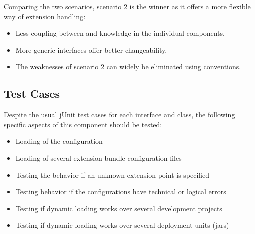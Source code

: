 Comparing the two scenarios, scenario 2 is the winner as it offers a more flexible way of extension handling:
\begin{itemize}
	\item Less coupling between and knowledge in the individual components.
	\item More generic interfaces offer better changeability.
	\item The weaknesses of scenario 2 can widely be eliminated using conventions.
\end{itemize}


\subsection{Test Cases}
\label{sec:TestCasesCOMPextensionManagement}

Despite the usual jUnit test cases for each interface and class, the following specific aspects of this component should be tested:
\begin{itemize}
	\item Loading of the \COMPextensionManagement{} configuration
	\item Loading of several extension bundle configuration files
	\item Testing the behavior if an unknown extension point is specified
	\item Testing behavior if the configurations have technical or logical errors
	\item Testing if dynamic loading works over several development projects
	\item Testing if dynamic loading works over several deployment units (jars)
\end{itemize}

%
%
